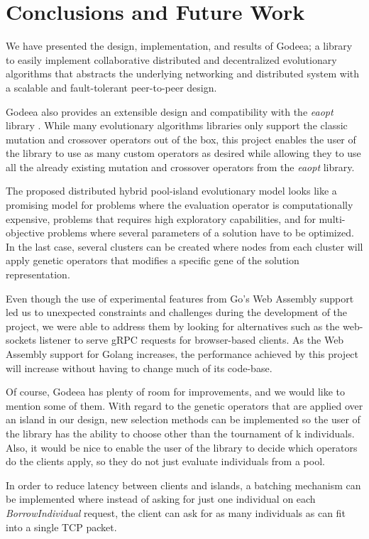 \chapter{Conclusions and Future Work}

We have presented the design, implementation, and results of Godeea; a library to easily implement collaborative distributed and decentralized evolutionary algorithms that abstracts the underlying networking and distributed system with a scalable and fault-tolerant peer-to-peer design.

Godeea also provides an extensible design and compatibility with the \textit{eaopt} library \cite{eaopt}. While many evolutionary algorithms libraries only support the classic mutation and crossover operators out of the box, this project enables the user of the library to use as many custom operators as desired while allowing they to use all the already existing mutation and crossover operators from the \textit{eaopt} library.

The proposed distributed hybrid pool-island evolutionary model looks like a promising model for problems where the evaluation operator is computationally expensive, problems that requires high exploratory capabilities, and for multi-objective problems where several parameters of a solution have to be optimized. In the last case, several clusters can be created where nodes from each cluster will apply genetic operators that modifies a specific gene of the solution representation.

Even though the use of experimental features from Go's Web Assembly support led us to unexpected constraints and challenges during the development of the project, we were able to address them by looking for alternatives such as the web-sockets listener to serve gRPC requests for browser-based clients. As the Web Assembly support for Golang increases, the performance achieved by this project will increase without having to change much of its code-base.

Of course, Godeea has plenty of room for improvements, and we would like to mention some of them. With regard to the genetic operators that are applied over an island in our design, new selection methods can be implemented so the user of the library has the ability to choose other than the tournament of k individuals. Also, it would be nice to enable the user of the library to decide which operators do the clients apply, so they do not just evaluate individuals from a pool. 

In order to reduce latency between clients and islands, a batching mechanism can be implemented where instead of asking for just one individual on each \textit{BorrowIndividual} request, the client can ask for as many individuals as can fit into a single TCP packet.

